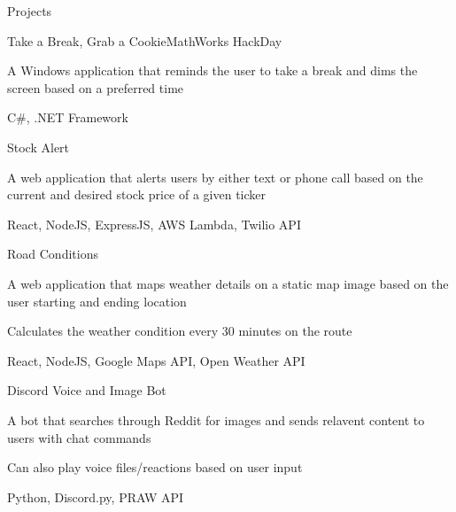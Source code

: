 \documentclass{resume} %
\begin{document}
\begin{rSection}{Projects}

    \begin{rSubsection}{Take a Break, Grab a Cookie}{}{MathWorks HackDay}{}
        \item A Windows application that reminds the user to take a break and dims the screen based on a preferred time
        \item C\#, .NET Framework
    \end{rSubsection}

    \begin{rSubsection}{Stock Alert}{}{}{}
        \item A web application that alerts users by either text or phone call based on the current and desired stock price of a given ticker
        \item React, NodeJS, ExpressJS, AWS Lambda, Twilio API
    \end{rSubsection}


    \begin{rSubsection}{Road Conditions}{}{}{}

        \item A web application that maps weather details on a static map image based on the user starting and ending location
        \item Calculates the weather condition every 30 minutes on the route
        \item React, NodeJS, Google Maps API, Open Weather API
    \end{rSubsection}


    \begin{rSubsection}{Discord Voice and Image Bot}{}{}{}

        \item A bot that searches through Reddit for images and sends relavent content to users with chat commands
        \item Can also play voice files/reactions based on user input
        \item Python, Discord.py, PRAW API
    \end{rSubsection}

\end{rSection}
\end{document}
